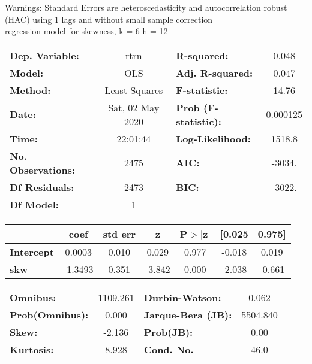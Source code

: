 Warnings: \newline
 [1] Standard Errors are heteroscedasticity and autocorrelation robust (HAC) using 1 lags and without small sample correction\\ 

regression model for skewness, k = 6 h = 12\begin{center}
\begin{tabular}{lclc}
\toprule
\textbf{Dep. Variable:}    &       rtrn       & \textbf{  R-squared:         } &     0.048   \\
\textbf{Model:}            &       OLS        & \textbf{  Adj. R-squared:    } &     0.047   \\
\textbf{Method:}           &  Least Squares   & \textbf{  F-statistic:       } &     14.76   \\
\textbf{Date:}             & Sat, 02 May 2020 & \textbf{  Prob (F-statistic):} &  0.000125   \\
\textbf{Time:}             &     22:01:44     & \textbf{  Log-Likelihood:    } &    1518.8   \\
\textbf{No. Observations:} &        2475      & \textbf{  AIC:               } &    -3034.   \\
\textbf{Df Residuals:}     &        2473      & \textbf{  BIC:               } &    -3022.   \\
\textbf{Df Model:}         &           1      & \textbf{                     } &             \\
\bottomrule
\end{tabular}
\begin{tabular}{lcccccc}
                   & \textbf{coef} & \textbf{std err} & \textbf{z} & \textbf{P$> |$z$|$} & \textbf{[0.025} & \textbf{0.975]}  \\
\midrule
\textbf{Intercept} &       0.0003  &        0.010     &     0.029  &         0.977        &       -0.018    &        0.019     \\
\textbf{skw}       &      -1.3493  &        0.351     &    -3.842  &         0.000        &       -2.038    &       -0.661     \\
\bottomrule
\end{tabular}
\begin{tabular}{lclc}
\textbf{Omnibus:}       & 1109.261 & \textbf{  Durbin-Watson:     } &    0.062  \\
\textbf{Prob(Omnibus):} &   0.000  & \textbf{  Jarque-Bera (JB):  } & 5504.840  \\
\textbf{Skew:}          &  -2.136  & \textbf{  Prob(JB):          } &     0.00  \\
\textbf{Kurtosis:}      &   8.928  & \textbf{  Cond. No.          } &     46.0  \\
\bottomrule
\end{tabular}
\end{center}

